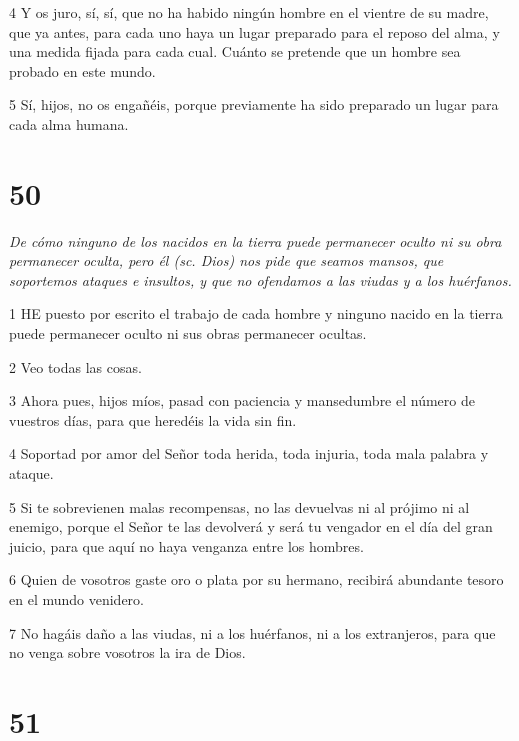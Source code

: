 \par 4 Y os juro, sí, sí, que no ha habido ningún hombre en el vientre de su madre, que ya antes, para cada uno haya un lugar preparado para el reposo del alma, y ​​una medida fijada para cada cual. Cuánto se pretende que un hombre sea probado en este mundo.

\par 5 Sí, hijos, no os engañéis, porque previamente ha sido preparado un lugar para cada alma humana.

\chapter{50}

\par \textit{De cómo ninguno de los nacidos en la tierra puede permanecer oculto ni su obra permanecer oculta, pero él (sc. Dios) nos pide que seamos mansos, que soportemos ataques e insultos, y que no ofendamos a las viudas y a los huérfanos.}

\par 1 HE puesto por escrito el trabajo de cada hombre y ninguno nacido en la tierra puede permanecer oculto ni sus obras permanecer ocultas.

\par 2 Veo todas las cosas.

\par 3 Ahora pues, hijos míos, pasad con paciencia y mansedumbre el número de vuestros días, para que heredéis la vida sin fin.

\par 4 Soportad por amor del Señor toda herida, toda injuria, toda mala palabra y ataque.

\par 5 Si te sobrevienen malas recompensas, no las devuelvas ni al prójimo ni al enemigo, porque el Señor te las devolverá y será tu vengador en el día del gran juicio, para que aquí no haya venganza entre los hombres.

\par 6 Quien de vosotros gaste oro o plata por su hermano, recibirá abundante tesoro en el mundo venidero.

\par 7 No hagáis daño a las viudas, ni a los huérfanos, ni a los extranjeros, para que no venga sobre vosotros la ira de Dios.

\chapter{51}

